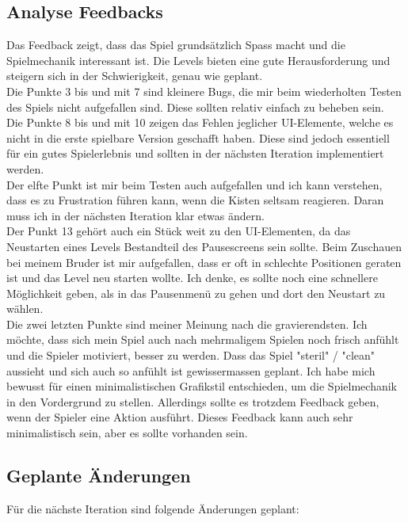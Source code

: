 \documentclass{article}
\begin{document}
\subsection{Analyse Feedbacks}

Das Feedback zeigt, dass das Spiel grundsätzlich Spass macht und die Spielmechanik interessant ist. Die Levels bieten eine gute Herausforderung
und steigern sich in der Schwierigkeit, genau wie geplant.
\\
Die Punkte 3 bis und mit 7 sind kleinere Bugs, die mir beim wiederholten Testen des Spiels nicht aufgefallen sind. Diese sollten relativ einfach zu beheben sein.
\\
Die Punkte 8 bis und mit 10 zeigen das Fehlen jeglicher UI-Elemente, welche es nicht in die erste spielbare Version geschafft haben. Diese sind jedoch
essentiell für ein gutes Spielerlebnis und sollten in der nächsten Iteration implementiert werden.
\\
Der elfte Punkt ist mir beim Testen auch aufgefallen und ich kann verstehen, dass es zu Frustration führen kann, wenn die Kisten seltsam reagieren. Daran muss
ich in der nächsten Iteration klar etwas ändern.
\\
Der Punkt 13 gehört auch ein Stück weit zu den UI-Elementen, da das Neustarten eines Levels Bestandteil des Pausescreens sein sollte. Beim Zuschauen bei meinem Bruder
ist mir aufgefallen, dass er oft in schlechte Positionen geraten ist und das Level neu starten wollte. Ich denke, es sollte noch eine schnellere Möglichkeit geben,
als in das Pausenmenü zu gehen und dort den Neustart zu wählen.
\\
Die zwei letzten Punkte sind meiner Meinung nach die gravierendsten. Ich möchte, dass sich mein Spiel auch nach mehrmaligem Spielen noch frisch anfühlt und die Spieler
motiviert, besser zu werden. Dass das Spiel "steril" / "clean" aussieht und sich auch so anfühlt ist gewissermassen geplant. Ich habe mich bewusst für einen minimalistischen
Grafikstil entschieden, um die Spielmechanik in den Vordergrund zu stellen. Allerdings sollte es trotzdem Feedback geben, wenn der Spieler eine Aktion ausführt. Dieses
Feedback kann auch sehr minimalistisch sein, aber es sollte vorhanden sein.

\subsection{Geplante Änderungen}

Für die nächste Iteration sind folgende Änderungen geplant:
\end{document}
